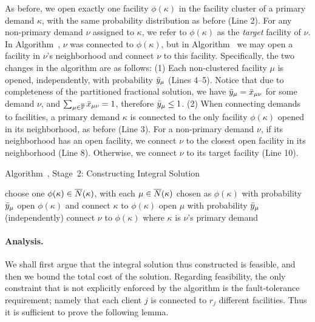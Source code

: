 \documentclass[11pt]{article}
\begin{document}
As before, we open exactly one facility $\phi(\kappa)$ in
the facility cluster of a primary demand $\kappa$, with the
same probability distribution as before (Line 2).  For any
non-primary demand $\nu$ assigned to $\kappa$, we refer to
$\phi(\kappa)$ as the \emph{target} facility of $\nu$.  In
Algorithm~{\EGUP}, $\nu$ was connected to $\phi(\kappa)$,
but in Algorithm~{\ECHU} we may open a facility in $\nu$'s
neighborhood and connect $\nu$ to this facility.
Specifically, the two changes in the algorithm are as
follows: (1) Each non-clustered facility $\mu$ is opened,
independently, with probability ${\bar y}_{\mu}$ (Lines
4--5). Notice that due to completeness of the partitioned
fractional solution, we have ${\bar y}_{\mu}={\bar x}_{\mu\nu}$
for some demand $\nu$, and $\sum_{\mu\in\overline{\mathbb{F}}}
{\bar x}_{\mu\nu} = 1$, therefore ${\bar y}_{\mu}\leq 1$.  (2)
When connecting demands to facilities, a primary demand
$\kappa$ is connected to the only facility $\phi(\kappa)$
opened in its neighborhood, as before (Line 3).  For a
non-primary demand $\nu$, if its neighborhood has an open
facility, we connect $\nu$ to the closest open facility in
its neighborhood (Line 8). Otherwise, we connect $\nu$ to
its target facility (Line 10).


\begin{algorithm}
  \caption{Algorithm~{\ECHU}, Stage~2:
    Constructing Integral Solution}
  \label{alg:lpr3}
  \begin{algorithmic}[1]
    \State choose one $\phi(\kappa)\in {\overline{N}}(\kappa)$,
    with each $\mu\in{\overline{N}}(\kappa)$ chosen as $\phi(\kappa)$
    with probability ${\bar y}_\mu$
    \State open $\phi(\kappa)$ and connect $\kappa$ to $\phi(\kappa)$
    \EndFor
    \State open $\mu$ with probability ${\bar y}_\mu$ (independently)
    \EndFor
    \Else
    \State connect $\nu$ to $\phi(\kappa)$ where $\kappa$ is $\nu$'s
     primary demand
    \EndIf
    \EndFor
  \end{algorithmic}
\end{algorithm}


\paragraph{Analysis.}
We shall first argue that the integral solution thus
constructed is feasible, and then we bound the total cost of
the solution. Regarding feasibility, the only constraint that is
not explicitly enforced by the algorithm is the fault-tolerance
requirement; namely that each client $j$ is connected to $r_j$
different facilities. Thus it is sufficient to prove the following lemma.
\end{document}
